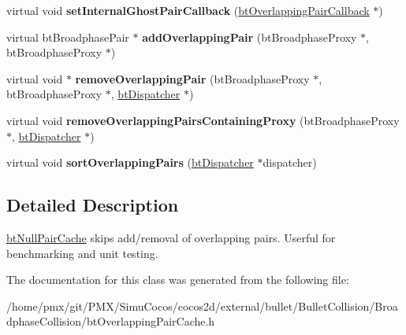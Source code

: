 \begin{DoxyCompactItemize}
virtual void {\bfseries set\+Internal\+Ghost\+Pair\+Callback} (\hyperlink{classbtOverlappingPairCallback}{bt\+Overlapping\+Pair\+Callback} $\ast$)
\item 
\mbox{\label{classbtNullPairCache_a76137e4519323ff5589d5702752bc2cb}} 
virtual bt\+Broadphase\+Pair $\ast$ {\bfseries add\+Overlapping\+Pair} (bt\+Broadphase\+Proxy $\ast$, bt\+Broadphase\+Proxy $\ast$)
\item 
\mbox{\label{classbtNullPairCache_a436b8c6da50f69e53425abb7cdc7976c}} 
virtual void $\ast$ {\bfseries remove\+Overlapping\+Pair} (bt\+Broadphase\+Proxy $\ast$, bt\+Broadphase\+Proxy $\ast$, \hyperlink{classbtDispatcher}{bt\+Dispatcher} $\ast$)
\item 
\mbox{\label{classbtNullPairCache_a87574120b56624b329c0a0faf7fd5461}} 
virtual void {\bfseries remove\+Overlapping\+Pairs\+Containing\+Proxy} (bt\+Broadphase\+Proxy $\ast$, \hyperlink{classbtDispatcher}{bt\+Dispatcher} $\ast$)
\item 
\mbox{\label{classbtNullPairCache_a12eeb9eea98cf0314d59e65feb95d344}} 
virtual void {\bfseries sort\+Overlapping\+Pairs} (\hyperlink{classbtDispatcher}{bt\+Dispatcher} $\ast$dispatcher)
\end{DoxyCompactItemize}


\subsection{Detailed Description}
\hyperlink{classbtNullPairCache}{bt\+Null\+Pair\+Cache} skips add/removal of overlapping pairs. Userful for benchmarking and unit testing. 

The documentation for this class was generated from the following file\+:\begin{DoxyCompactItemize}
\item 
/home/pmx/git/\+P\+M\+X/\+Simu\+Cocos/cocos2d/external/bullet/\+Bullet\+Collision/\+Broadphase\+Collision/bt\+Overlapping\+Pair\+Cache.\+h\end{DoxyCompactItemize}
